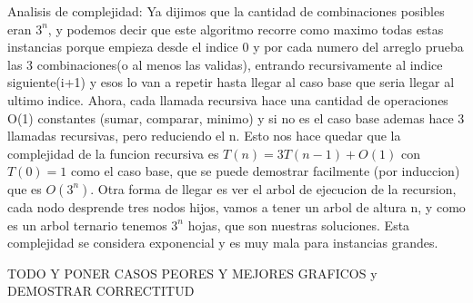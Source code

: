 Analisis de complejidad:
Ya dijimos que la cantidad de combinaciones posibles eran $3^n$, y podemos decir que este algoritmo recorre como maximo todas estas instancias porque empieza desde el indice 0 y por cada numero del arreglo prueba las 3 combinaciones(o al menos las validas), entrando recursivamente al indice siguiente(i+1) y esos lo van a repetir hasta llegar al caso base que seria llegar al ultimo indice. Ahora, cada llamada recursiva hace una cantidad de operaciones O(1) constantes (sumar, comparar, minimo) y si no es el caso base ademas hace 3 llamadas recursivas, pero reduciendo el n. Esto nos hace quedar que la complejidad de la funcion recursiva es $T(n) = 3T(n-1) + O(1)$ con $T(0) = 1$ como el caso base, que se puede demostrar facilmente (por induccion) que es $O(3^n)$. Otra forma de llegar es ver el arbol de ejecucion de la recursion, cada nodo desprende tres nodos hijos, vamos a tener un arbol de altura n, y como es un arbol ternario tenemos $3^n$ hojas, que son nuestras soluciones. Esta complejidad se considera exponencial y es muy mala para instancias grandes.

TODO Y PONER CASOS PEORES Y MEJORES GRAFICOS y DEMOSTRAR CORRECTITUD




